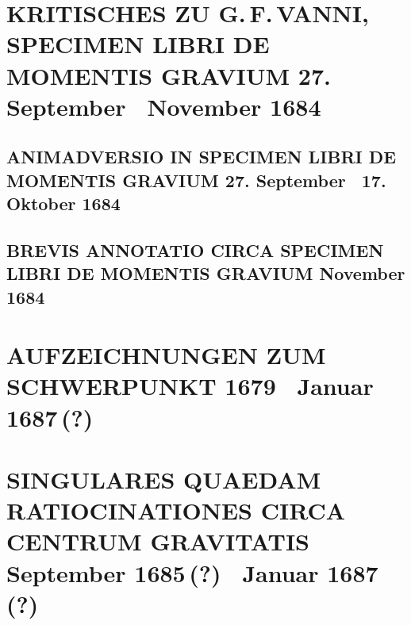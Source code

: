 \documentclass[%
fontsize=10pt,
]{scrbook}
\DeclareRobustCommand{\bracks}[1]{%
\textup{\lbrack}#1\textup{\rbrack}}
\begin{document}
\chapter[tocentry={Kritisches zu G.\,F.\,Vanni, Specimen libri de momentis gravium
\enskip \bracks{27. September \textendash\ November 1684}},
head={Kritisches zu Vanni, Specimen}]%
{\MakeUppercase{Kritisches zu G.\,F.\,Vanni, Specimen libri de momentis gravium}
\newline \bracks{27. September \textendash\ November 1684}}%
\label{intro_vanni-specimen}

\section[tocentry={Animadversio in Specimen libri de momentis gravium
\enskip \bracks{27. September \textendash\ 17. Oktober 1684}%
},
head={Animadversio in Specimen}]%
{\MakeUppercase{Animadversio in Specimen libri de momentis gravium}
\newline \bracks{27. September \textendash\ 17. Oktober 1684}
}%
\label{41667}

\section[tocentry={Brevis annotatio circa Specimen libri de momentis gravium
\enskip November 1684%
},
head={Brevis annotatio circa Specimen}]%
{\MakeUppercase{Brevis annotatio circa Specimen libri de momentis gravium}
\newline November 1684%
}
\label{55606}






\chapter[tocentry={Aufzeichnungen zum Schwerpunkt
\enskip \bracks{1679 \textendash\ Januar 1687\,(?)}},
head={Aufzeichnungen zum Schwerpunkt}]%
{\MakeUppercase{Aufzeichnungen zum Schwerpunkt}
\newline \bracks{1679 \textendash\ Januar 1687\,(?)}}

\label{Cc2-1421}	%
\label{5konzepte133}	%





\chapter[tocentry={Singulares quaedam ratiocinationes circa centrum gravitatis
\enskip \bracks{September 1685\,(?) \textendash\ Januar 1687\,(?)}
},
head={Singulares quaedam ratiocinationes circa centrum gravitatis}]%
{\MakeUppercase{Singulares quaedam ratiocinationes circa centrum gravitatis}
\newline \bracks{September 1685\,(?) \textendash\ Januar 1687\,(?)}
}
\end{document}
